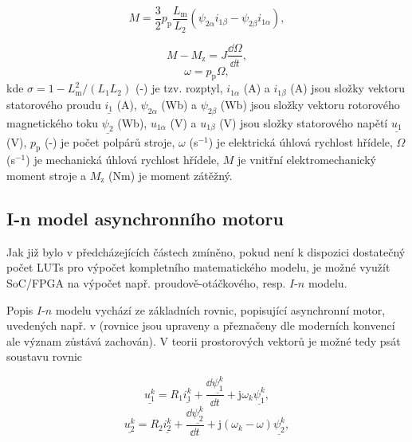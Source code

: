 \documentclass[a4paper, twoside, 11pt]{article}
\begin{document}
\begin{equation}
    M = \frac{3}{2} p_\text{p} \frac{L_\text{m}}{L_2} (\psi_{2\alpha} i_{1\beta} - \psi_{2\beta} i_{1\alpha}),
\end{equation}

\begin{equation}
    M - M_\text{z} = J \frac{\dd{\Omega}}{\dd{t}},
\end{equation}
\begin{equation}
    \omega = p_\text{p} \Omega,
\end{equation}
kde $\sigma = 1 - L_\text{m}^{2}/(L_1 L_2)$ (-) je tzv. rozptyl, $i_{1\alpha}$ (A) a $i_{1\beta}$ (A) jsou složky vektoru statorového proudu $\underline{i_1}$ (A), $\psi_{2\alpha}$ (Wb) a $\psi_{2\beta}$ (Wb) jsou složky vektoru rotorového magnetického toku $\underline{\psi_2}$ (Wb), $u_{1\alpha}$ (V) a $u_{1\beta}$ (V) jsou složky statorového napětí $\underline{u_1}$ (V), $p_\text{p}$ (-) je počet polpárů stroje, $\omega$ (s$^{-1}$) je elektrická úhlová rychlost hřídele, $\Omega$ (s$^{-1}$) je mechanická úhlová rychlost hřídele, $M$ je vnitřní elektromechanický moment stroje a $M_\text{z}$ (Nm) je moment zátěžný.

	\subsection{I-n model asynchronního motoru}
		Jak již bylo v předcházejících částech zmíněno, pokud není k dispozici dostatečný počet LUTs pro výpočet kompletního matematického modelu, je možné využít SoC/FPGA na výpočet např. proudově-otáčkového, resp. $I$-$n$ modelu.\par
		Popis $I$-$n$ modelu vychází ze základních rovnic, popisující asynchronní motor, uvedených např. v \cite{kobrle-elektricke-pohony} (rovnice jsou upraveny a přeznačeny dle moderních konvencí ale význam zůstává zachován). V teorii prostorových vektorů je možné tedy psát soustavu rovnic

		\begin{equation}
			\underline{u_{1}^{k}} = R_1 \underline{i_{1}^{k}} + \frac{\dd{\underline{\psi_1^{k}}}}{\dd{t}} + \text{j} \omega_k \underline{\psi_1^{k}},
		\end{equation}
		\begin{equation}
			\underline{u_{2}^{k}} = R_2 \underline{i_{2}^{k}} + \frac{\dd{\underline{\psi_2^{k}}}}{\dd{t}} + \text{j} (\omega_k - \omega) \underline{\psi_2^{k}},
		\end{equation}
	
\end{document}
